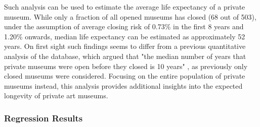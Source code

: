 \documentclass[12pt]{article}
\begin{document}
Such analysis can be used to estimate the average life expectancy of a private museum.
While only a fraction of all opened museums has closed (68 out of 503), under the assumption of average closing risk of 0.73\% in the first 8 years and 1.20\% onwards, median life expectancy can be estimated as approximately 52 years.
On first sight such findings seems to differ from a previous quantitative analysis of the database, which argued that "the median number of years that private museums were open before they closed is 10 years" \parencite[p.5]{Velthuis_Gera_2024_fragility}, as previously only closed museums were considered.
Focusing on the entire population of private museums instead, this analysis provides additional insights into the expected longevity of private art museums.
\subsubsection*{Regression Results}
\end{document}
